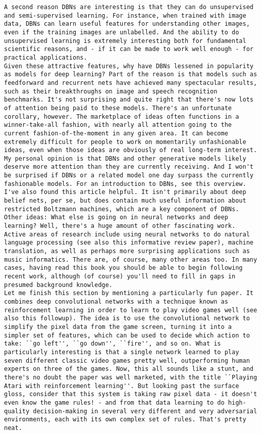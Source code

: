 \begin{lstlisting}
A second reason DBNs are interesting is that they can do unsupervised and semi-supervised learning. For instance, when trained with image data, DBNs can learn useful features for understanding other images, even if the training images are unlabelled. And the ability to do unsupervised learning is extremely interesting both for fundamental scientific reasons, and - if it can be made to work well enough - for practical applications.
Given these attractive features, why have DBNs lessened in popularity as models for deep learning? Part of the reason is that models such as feedforward and recurrent nets have achieved many spectacular results, such as their breakthroughs on image and speech recognition benchmarks. It's not surprising and quite right that there's now lots of attention being paid to these models. There's an unfortunate corollary, however. The marketplace of ideas often functions in a winner-take-all fashion, with nearly all attention going to the current fashion-of-the-moment in any given area. It can become extremely difficult for people to work on momentarily unfashionable ideas, even when those ideas are obviously of real long-term interest. My personal opinion is that DBNs and other generative models likely deserve more attention than they are currently receiving. And I won't be surprised if DBNs or a related model one day surpass the currently fashionable models. For an introduction to DBNs, see this overview. I've also found this article helpful. It isn't primarily about deep belief nets, per se, but does contain much useful information about restricted Boltzmann machines, which are a key component of DBNs.
Other ideas: What else is going on in neural networks and deep learning? Well, there's a huge amount of other fascinating work. Active areas of research include using neural networks to do natural language processing (see also this informative review paper), machine translation, as well as perhaps more surprising applications such as music informatics. There are, of course, many other areas too. In many cases, having read this book you should be able to begin following recent work, although (of course) you'll need to fill in gaps in presumed background knowledge.
Let me finish this section by mentioning a particularly fun paper. It combines deep convolutional networks with a technique known as reinforcement learning in order to learn to play video games well (see also this followup). The idea is to use the convolutional network to simplify the pixel data from the game screen, turning it into a simpler set of features, which can be used to decide which action to take: ``go left'', ``go down'', ``fire'', and so on. What is particularly interesting is that a single network learned to play seven different classic video games pretty well, outperforming human experts on three of the games. Now, this all sounds like a stunt, and there's no doubt the paper was well marketed, with the title ``Playing Atari with reinforcement learning''. But looking past the surface gloss, consider that this system is taking raw pixel data - it doesn't even know the game rules! - and from that data learning to do high-quality decision-making in several very different and very adversarial environments, each with its own complex set of rules. That's pretty neat.

\end{lstlisting}
